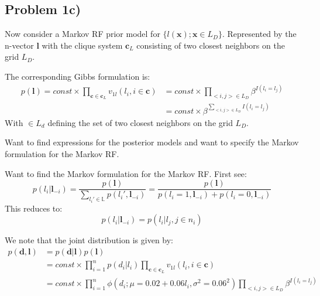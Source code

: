\documentclass[]{article}
\newcommand{\vect}[1]{\ensuremath{\boldsymbol{\mathbf{#1}}}}
\begin{document}
\hypertarget{problem-1c}{%
\subsection{Problem 1c)}\label{problem-1c}}

Now consider a Markov RF prior model for
\(\lbrace l(\vect x); \vect x \in L_D \rbrace\). Represented by the
n-vector \(\vect l\) with the clique system \(\vect c_L\) consisting of
two closest neighbors on the grid \(L_D\).

The corresponding Gibbs formulation is: \begin{equation}
    \begin{split}
    p(\vect l) = const \times \prod_{\vect c \in \vect c_L} v_{1l}(l_i, i \in \vect c) &= const \times \prod_{<i, j>\in L_D} \beta^{I(l_i = l_j)} \\
    &= const \times \beta^{\sum_{<i, j>\in L_D} I(l_i = l_j)}
    \end{split}
\end{equation} With \(<i, j> \in L_d\) defining the set of two closest
neighbors on the grid \(L_D\).

Want to find expressions for the posterior models and want to specify
the Markov formulation for the Markov RF.

Want to find the Markov formulation for the Markov RF. First see:\\
\begin{equation}
    p(l_i | \vect l_{-i}) = \dfrac{p(\vect l)}{\sum_{l_i' \in \mathbb{L}} p(l_i', \vect l_{-i})} = \dfrac{p(\vect l)}{p(l_i = 1, \vect l_{-i}) +p(l_i = 0, \vect l_{-i})} 
 \end{equation} This reduces to: \begin{equation}
    p(l_i | \vect l_{-i}) = p(l_i | l_j, j \in n_i)
 \end{equation}

We note that the joint distribution is given by: \begin{equation}
    \begin{split}
            p(\vect d, \vect l) &= p(\vect d | \vect l)p(\vect l) 
            \\ &= const \times \prod_{i=1}^{n}p(d_i | l_i) \prod_{\vect c \in \vect c_L} v_{1l}(l_i, i \in \vect c)
            \\ &= const \times \prod_{i=1}^{n}  \phi(d_i  ; \mu = 0.02 + 0.06l_i, \sigma^2 = 0.06^2) \prod_{<i, j>\in L_D} \beta^{I(l_i = l_j)}
    \end{split}
\end{equation}
\end{document}

